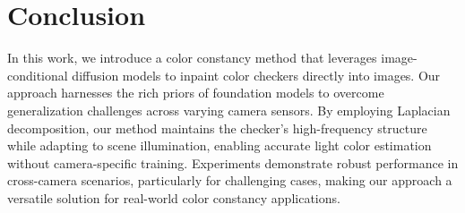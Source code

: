 
\section{Conclusion}
\label{sec:conclusion}
\vspace{-1mm}



In this work, we introduce a color constancy method that leverages image-conditional diffusion models to inpaint color checkers directly into images. Our approach harnesses the rich priors of foundation models to overcome generalization challenges across varying camera sensors. By employing Laplacian decomposition, our method maintains the checker's high-frequency structure while adapting to scene illumination, enabling accurate light color estimation without camera-specific training. Experiments demonstrate robust performance in cross-camera scenarios, particularly for challenging cases, making our approach a versatile solution for real-world color constancy applications.



